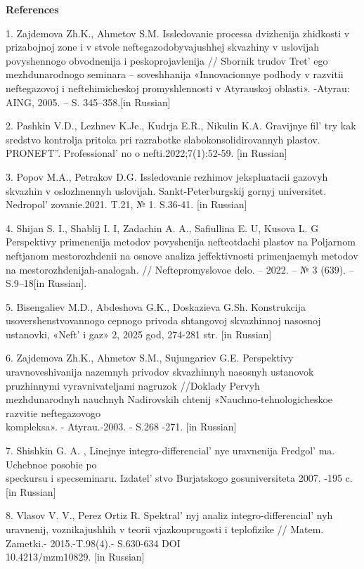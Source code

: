 \begin{center}
{\bfseries References}
\end{center}

\begin{references}
1. Zajdemova Zh.K., Ahmetov S.M. Issledovanie processa dvizhenija
zhidkosti v prizabojnoj zone i v stvole neftegazodobyvajushhej skvazhiny
v uslovijah povyshennogo obvodnenija i peskoprojavlenija // Sbornik
trudov Tret' ego mezhdunarodnogo seminara -- soveshhanija
«Innovacionnye podhody v razvitii neftegazovoj i neftehimicheskoj
promyshlennosti v Atyrauskoj oblasti». -Atyrau: AING, 2005. -- S.
345--358.{[}in Russian{]}

2. Pashkin V.D., Lezhnev K.Je., Kudrja E.R., Nikulin K.A. Gravijnye
fil' try kak sredstvo kontrolja pritoka pri razrabotke
slabokonsolidirovannyh plastov. PRONEFT''.
Professional' no o nefti.2022;7(1):52-59. {[}in
Russian{]}

3. Popov M.A., Petrakov D.G. Issledovanie rezhimov jekspluatacii gazovyh
skvazhin v oslozhnennyh uslovijah. Sankt-Peterburgskij gornyj
universitet. Nedropol' zovanie.2021. T.21, № 1.
S.36-41. {[}in Russian{]}

4. Shijan S. I., Shablij I. I, Zadachin A. A., Safiullina E. U, Kusova
L. G Perspektivy primenenija metodov povyshenija nefteotdachi plastov na
Poljarnom neftjanom mestorozhdenii na osnove analiza jeffektivnosti
primenjaemyh metodov na mestorozhdenijah-analogah. // Neftepromyslovoe
delo. -- 2022. -- № 3 (639). -- S.9--18{[}in Russian{]}.

5. Bisengaliev M.D., Abdeshova G.K., Doskazieva G.Sh. Konstrukcija
usovershenstvovannogo cepnogo privoda shtangovoj skvazhinnoj nasosnoj
ustanovki, «Neft'{} i gaz» 2, 2025 god, 274-281 str.
{[}in Russian{]}

6. Zajdemova Zh.K., Ahmetov S.M., Sujungariev G.E. Perspektivy
uravnoveshivanija nazemnyh privodov skvazhinnyh nasosnyh ustanovok
pruzhinnymi vyravnivateljami nagruzok //Doklady Pervyh \\mezhdunarodnyh
nauchnyh Nadirovskih chtenij «Nauchno-tehnologicheskoe razvitie
neftegazovogo \\kompleksa». - Atyrau.-2003. - S.268 -271. {[}in
Russian{]}

7. Shishkin G. A. , Linejnye integro-differencial' nye
uravnenija Fredgol' ma. Uchebnoe posobie po \\speckursu i
specseminaru. Izdatel' stvo Burjatskogo gosuniversiteta
2007. -195 c. {[}in Russian{]}

8. Vlasov V. V., Perez Ortiz R. Spektral' nyj analiz
integro-differencial' nyh uravnenij, voznikajushhih v
teorii vjazkouprugosti i teplofizike // Matem. Zametki.- 2015.-T.98(4).-
S.630-634 DOI \\10.4213/mzm10829. {[}in Russian{]}


\end{references}
